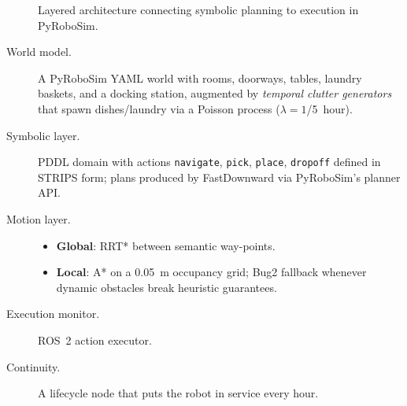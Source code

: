 \documentclass[11pt]{article}
\begin{document}
\begin{figure}[h]
\centering
{}
\caption{Layered architecture connecting symbolic planning to execution in PyRoboSim.}
\end{figure}


\begin{description}
\item[World model.]  A PyRoboSim YAML world with rooms, doorways, tables, laundry baskets, and a docking station, augmented by \emph{temporal clutter generators} that spawn dishes/laundry via a Poisson process ($\lambda=1$/5~hour).
\item[Symbolic layer.]  PDDL domain with actions \texttt{navigate}, \texttt{pick}, \texttt{place}, \texttt{dropoff} defined in STRIPS form; plans produced by FastDownward via PyRoboSim's planner API.
\item[Motion layer.]
      \begin{itemize}
        \item \textbf{Global}: RRT* between semantic way-points.
        \item \textbf{Local}: A* on a 0.05~m occupancy grid; Bug2 fallback whenever dynamic obstacles break heuristic guarantees.
      \end{itemize}
\item[Execution monitor.]  ROS~2 action executor.
\item[Continuity.]  A lifecycle node that puts the robot in service every hour.
\end{description}
\end{document}
